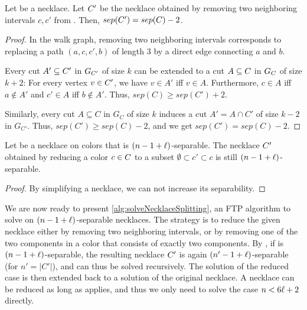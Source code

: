 \documentclass[a4paper,UKenglish,cleveref, thm-restate]{lipics-v2021}
\begin{document}
\begin{lemma}
\label{lem:SeparabilityWhenRemovingInterval}
Let \Colors be a necklace. Let $\Colors'$ be the necklace obtained by removing two neighboring intervals $c,c'$ from \Colors. Then, $sep(\Colors')= sep(\Colors)-2$.
\end{lemma}
\begin{proof}
    In the walk graph, removing two neighboring intervals corresponds to replacing a path $(a,c,c',b)$ of length $3$ by a direct edge connecting $a$ and $b$.
    
    Every cut $A'\subseteq \Colors'$ in $G_{\Colors'}$ of size $k$ can be extended to a cut $A\subseteq\Colors$ in $G_\Colors$ of size $k+2$: For every vertex $v\in \Colors'$, we have $v\in A'$ iff $v\in A$. Furthermore, $c\in A$ iff $a\not\in A'$ and $c'\in A$ iff $b\not\in A'$. Thus, $sep(C)\geq sep(C')+2$. 

    Similarly, every cut $A\subseteq C$ in $G_C$ of size $k$ induces a cut $A'=A\cap C'$ of size $k-2$ in $G_{C'}$. Thus, $sep(C')\geq sep(C)-2$, and we get $sep(C')=sep(C)-2$.
\end{proof}

\begin{lemma}
\label{lem:SeparabilityWhenCollapsingTwoComponents}
Let \Colors be a necklace on \dimension colors that is $(\dimension-1+\constB)$-separable. The necklace $\Colors'$ obtained by reducing a color $c\in\Colors$ to a subset $\emptyset\subset c'\subset c$ is still $(\dimension-1+\constB)$-separable. 
\end{lemma}
\begin{proof}
    By simplifying a necklace, we can not increase its separability.
\end{proof}

We are now ready to present \cref{alg:solveNecklaceSplitting}, an FTP algorithm to solve \TwoThiefNecklaceSplitting on $(\dimension-1+\constB)$-separable necklaces.
The strategy is to reduce the given necklace either by removing two neighboring intervals, or by removing one of the two components in a color that consists of exactly two components. By , if \Colors is $(\dimension -1 + \constB)$-separable, the resulting necklace $\Colors'$ is again $(\dimension' -1 + \constB)$-separable (for $n'=|C'|$), and can thus be solved recursively. The solution of the reduced case is then extended back to a solution of the original necklace. A necklace can be reduced as long as  applies, and thus we only need to solve the case $\dimension<6\constB + 2$ directly.
\end{document}
